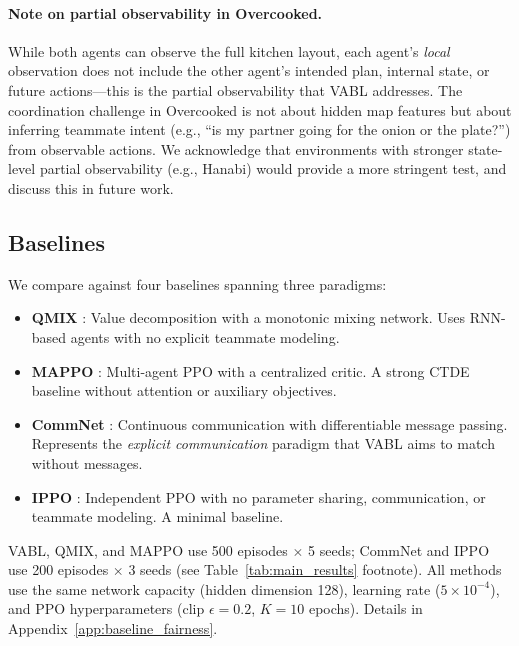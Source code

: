 \documentclass{article}
\theoremstyle{plain}
\theoremstyle{definition}
\theoremstyle{remark}
\begin{document}
\paragraph{Note on partial observability in Overcooked.} While both agents can observe the full kitchen layout, each agent's \emph{local} observation does not include the other agent's intended plan, internal state, or future actions---this is the partial observability that VABL addresses. The coordination challenge in Overcooked is not about hidden map features but about inferring teammate intent (e.g., ``is my partner going for the onion or the plate?'') from observable actions. We acknowledge that environments with stronger state-level partial observability (e.g., Hanabi) would provide a more stringent test, and discuss this in future work.

\subsection{Baselines}
We compare against four baselines spanning three paradigms:

\begin{itemize}
\item \textbf{QMIX} \cite{rashid2020monotonic}: Value decomposition with a monotonic mixing network. Uses RNN-based agents with no explicit teammate modeling.
\item \textbf{MAPPO} \cite{yu2022surprising}: Multi-agent PPO with a centralized critic. A strong CTDE baseline without attention or auxiliary objectives.
\item \textbf{CommNet} \cite{sukhbaatar2016commnet}: Continuous communication with differentiable message passing. Represents the \emph{explicit communication} paradigm that VABL aims to match without messages.
\item \textbf{IPPO} \cite{dewitt2020independent}: Independent PPO with no parameter sharing, communication, or teammate modeling. A minimal baseline.
\end{itemize}

VABL, QMIX, and MAPPO use 500 episodes $\times$ 5 seeds; CommNet and IPPO use 200 episodes $\times$ 3 seeds (see Table~\ref{tab:main_results} footnote). All methods use the same network capacity (hidden dimension 128), learning rate ($5 \times 10^{-4}$), and PPO hyperparameters (clip $\epsilon = 0.2$, $K = 10$ epochs). Details in Appendix~\ref{app:baseline_fairness}.
\end{document}
